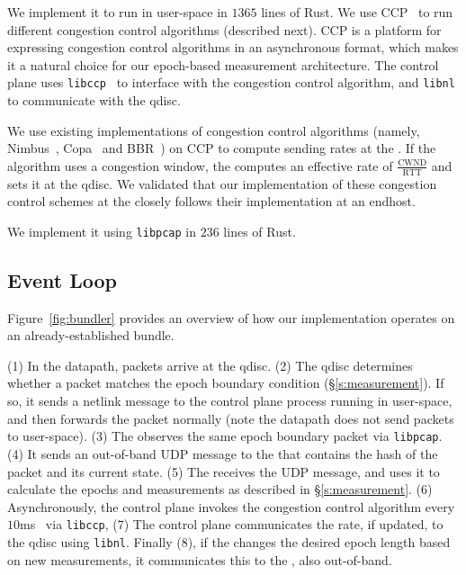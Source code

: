  We implement it to run in user-space in $1365$ lines of Rust.
We use CCP~\cite{ccp} to run different congestion control algorithms (described next). 
CCP is a platform for expressing congestion control algorithms in an asynchronous format, which makes it a natural choice for our epoch-based measurement architecture. 
The control plane uses \texttt{libccp}~\cite{ccp} to interface with the congestion control algorithm, and  \texttt{libnl} to communicate with the qdisc.

 We use existing implementations of congestion control algorithms (namely, Nimbus~\cite{nimbus}, Copa~\cite{copa} and BBR~\cite{bbr}) on CCP to compute sending rates at the \inbox.  If the algorithm uses a congestion window, the \inbox computes an effective rate of $\frac{\text{CWND}}{\text{RTT}}$ and sets it at the qdisc. 
We validated that our implementation of these congestion control schemes at the \inbox closely follows their implementation at an endhost.

\Para{\capoutbox} We implement it using \texttt{libpcap} in $236$ lines of Rust. 

\subsection{\name Event Loop}\label{s:impl:loop}
Figure~\ref{fig:bundler} provides an overview of how our \name implementation operates on an already-established bundle. 

(1) In the datapath, packets arrive at the \inbox qdisc.
(2) The qdisc determines whether a packet matches the epoch boundary condition (\S\ref{s:measurement}). 
If so, it sends a netlink message to the control plane process running in user-space, and then forwards the packet normally (note the datapath does not send packets to user-space). 
(3) The \outbox observes the same epoch boundary packet via \texttt{libpcap}.
(4) It sends an out-of-band UDP message to the \inbox that contains the hash of the packet and its current state. 
(5) The \inbox receives the UDP message, and uses it to calculate the epochs and measurements as described 
in \S\ref{s:measurement}. 
(6) Asynchronously, the \inbox control plane invokes the congestion control algorithm every $10$ms~\cite{ccp}
via \texttt{libccp},
(7) The \inbox control plane communicates the rate, if updated, to the qdisc
using \texttt{libnl}. 
Finally (8), if the \inbox changes the desired epoch length based on new measurements, it communicates this to the \outbox, also out-of-band.
